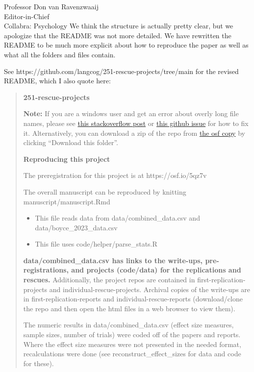 \documentclass{stanfordletter}
\newcommand{\revised}[1]{\begin{quote}	#1 \end{quote}}
\providecommand{\tightlist}{%
	\setlength{\itemsep}{0pt}\setlength{\parskip}{0pt}}
\begin{document}
\begin{letter}{Professor Don van Ravenzwaaij \\ Editor-in-Chief \\ Collabra: Psychology }
		We think the structure is actually pretty clear, but we apologize that the README was not more detailed. We have rewritten the README to be much more explicit about how to reproduce the paper as well as what all the folders and files contain.
		
		See  https://github.com/langcog/251-rescue-projects/tree/main for the revised README, which I also quote here:
		
		\revised{
		\textbf{\large 251-rescue-projects}\label{rescue-projects}
			
			\textbf{Note:} If you are a windows user and get an error about overly
			long file names, please see
			\href{https://stackoverflow.com/questions/22575662/filename-too-long-in-git-for-windows}{this
				stackoverflow post} or
			\href{https://github.com/desktop/desktop/issues/17882}{this github
				issue} for how to fix it. Alternatively, you can download a zip of the
			repo from \href{https://osf.io/cyk5w/files/github}{the osf copy} by
			clicking ``Download this folder''.
			
			
			\textbf{\large Reproducing this project}\label{reproducing-this-project}
			
			The preregistration for this project is at https://osf.io/5qz7v
			
			The overall manuscript can be reproduced by knitting
			manuscript/manuscript.Rmd 
			\begin{itemize}
				\tightlist
				\item 
				This file reads data from
				data/combined\_data.csv and data/boyce\_2023\_data.csv
				\item  
				This file uses
				code/helper/parse\_stats.R
			\end{itemize}
			
			\textbf{data/combined\_data.csv has links to the write-ups,
				pre-registrations, and projects (code/data) for the replications and
				rescues.} Additionally, the project repos are contained in
			first-replication-projects and individual-rescue-projects. Archival
			copies of the write-ups are in first-replication-reports and
			individual-rescue-reports (download/clone the repo and then open the
			html files in a web browser to view them).
			
			The numeric results in data/combined\_data.csv (effect size measures,
			sample sizes, number of trials) were coded off of the papers and
			reports. Where the effect size measures were not presented in the needed
			format, recalculations were done (see reconstruct\_effect\_sizes for
			data and code for these).
			
}
\end{letter}
\end{document}
